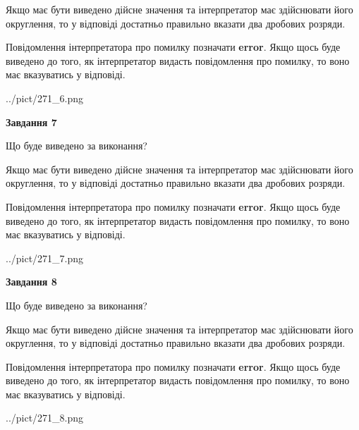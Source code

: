 \documentclass[12pt, ukrainian]{article}
\begin{document}
{\begin {Large}
Якщо має бути виведено дійсне значення та інтерпретатор має здійснювати його округлення, 
то у відповіді достатньо правильно вказати два дробових розряди.

Повідомлення інтерпретатора про помилку позначати \textbf{error}.
Якщо щось буде виведено до того, як інтерпретатор видасть повідомлення про помилку, 
то воно має вказуватись у відповіді. \par

\begin{center}
	{../pict/271_6.png}
\end{center}
\newpage

{\begin {center}\textbf{Завдання 7}\end {center}}\par
Що буде виведено за виконання? \par

Якщо має бути виведено дійсне значення та інтерпретатор має здійснювати його округлення, 
то у відповіді достатньо правильно вказати два дробових розряди.

Повідомлення інтерпретатора про помилку позначати \textbf{error}.
Якщо щось буде виведено до того, як інтерпретатор видасть повідомлення про помилку, 
то воно має вказуватись у відповіді. \par

\begin{center}
	{../pict/271_7.png}
\end{center}
\newpage

{\begin {center}\textbf{Завдання 8}\end {center}}\par
Що буде виведено за виконання? \par

Якщо має бути виведено дійсне значення та інтерпретатор має здійснювати його округлення, 
то у відповіді достатньо правильно вказати два дробових розряди.

Повідомлення інтерпретатора про помилку позначати \textbf{error}.
Якщо щось буде виведено до того, як інтерпретатор видасть повідомлення про помилку, 
то воно має вказуватись у відповіді. \par

\begin{center}
	{../pict/271_8.png}
\end{center}
\newpage


\end{Large}}
\end{document}

